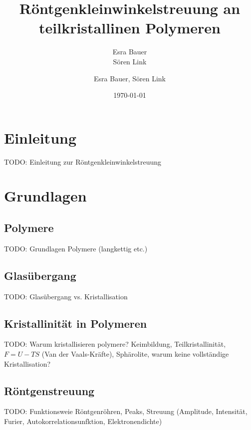 \documentclass[bigchapter,colorback,accentcolor=tud4b,linedtoc,11pt]{tudreport}
\title{Röntgenkleinwinkelstreuung an teilkristallinen Polymeren}
\subtitle{Esra Bauer  \\Sören Link}
\author{Esra Bauer, Sören Link}
\date{\today}
\begin{document}

\maketitle

\tableofcontents


\chapter{Einleitung}
TODO: Einleitung zur Röntgenkleinwinkelstreuung

\chapter{Grundlagen}
\section{Polymere}
TODO: Grundlagen Polymere (langkettig etc.)

\section{Glasübergang}
TODO: Glasübergang vs. Kristallisation

\section{Kristallinität in Polymeren}
TODO: Warum kristallisieren polymere? Keimbildung, Teilkristallinität, $F = U - TS$ (Van der Vaals-Kräfte), Sphärolite, warum keine vollständige Kristallisation?

\section{Röntgenstreuung}
TODO: Funktionsweie Röntgenröhren, Peaks, Streuung (Amplitude, Intensität, Furier, Autokorrelationsunfktion, Elektronendichte)
\end{document}
